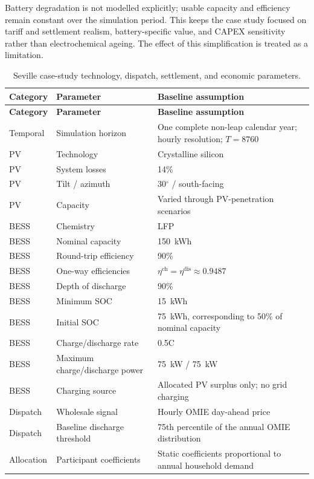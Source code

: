 Battery degradation is not modelled explicitly; usable capacity and efficiency remain constant over the simulation period. This keeps the case study focused on tariff and settlement realism, battery-specific value, and CAPEX sensitivity rather than electrochemical ageing. The effect of this simplification is treated as a limitation.

\begin{longtable}{p{}p{}p{}}
\caption{Seville case-study technology, dispatch, settlement, and economic parameters.}\label{tab:ch3_technology_economic_parameters}\\
\toprule
\textbf{Category} & \textbf{Parameter} & \textbf{Baseline assumption} \\
\midrule
\endfirsthead
\toprule
\textbf{Category} & \textbf{Parameter} & \textbf{Baseline assumption} \\
\midrule
\endhead
Temporal & Simulation horizon & One complete non-leap calendar year; hourly resolution; $T=8760$ \\
PV & Technology & Crystalline silicon \\
PV & System losses & 14\% \\
PV & Tilt / azimuth & 30$^\circ$ / south-facing \\
PV & Capacity & Varied through PV-penetration scenarios \\
BESS & Chemistry & LFP \\
BESS & Nominal capacity & 150~kWh \\
BESS & Round-trip efficiency & 90\% \\
BESS & One-way efficiencies & $\eta^{\mathrm{ch}}=\eta^{\mathrm{dis}}\approx0.9487$ \\
BESS & Depth of discharge & 90\% \\
BESS & Minimum SOC & 15~kWh \\
BESS & Initial SOC & 75~kWh, corresponding to 50\% of nominal capacity \\
BESS & Charge/discharge rate & 0.5C \\
BESS & Maximum charge/discharge power & 75~kW / 75~kW \\
BESS & Charging source & Allocated PV surplus only; no grid charging \\
Dispatch & Wholesale signal & Hourly OMIE day-ahead price \\
Dispatch & Baseline discharge threshold & 75th percentile of the annual OMIE distribution \\
Allocation & Participant coefficients & Static coefficients proportional to annual household demand \\

\end{longtable}
